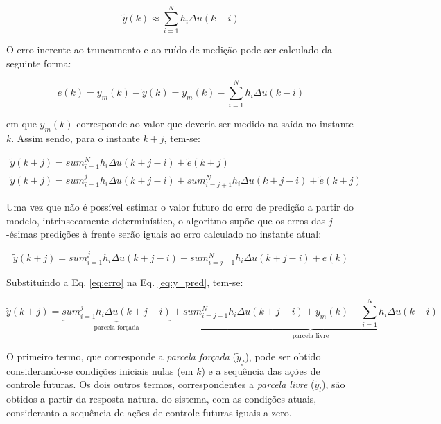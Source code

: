 \begin{equation}\label{eq:y_til}
\tilde{y}(k) \approx \sum_{i=1}^N h_i\Delta u(k-i)
\end{equation}

O erro inerente ao truncamento e ao ruído de medição pode ser calculado da
seguinte forma:

\begin{equation}\label{eq:erro}
e(k) = y_m(k) - \tilde{y}(k) = y_m(k) - \sum_{i=1}^N h_i\Delta u(k-i)
\end{equation}

\noindent em que $y_m(k)$ corresponde ao valor que deveria ser medido na saída
no instante $k$. Assim sendo, para o instante $k+j$, tem-se:

\begin{eqnarray}
\tilde{y}(k+j) = sum_{i=1}^N h_i\Delta u(k+j-i) + \tilde{e}(k+j)\nonumber\\
\tilde{y}(k+j) = sum_{i=1}^j h_i\Delta u(k+j-i) +
                 sum_{i=j+1}^N h_i\Delta u(k+j-i) + \tilde{e}(k+j)\nonumber
\end{eqnarray}

Uma vez que não é possível estimar o valor futuro do erro de predição a partir
do modelo, intrinsecamente determinístico, o algoritmo supõe que os erros das
$j$-ésimas predições à frente serão iguais ao erro calculado no instante atual:

\begin{equation}\label{eq:y_pred}
\tilde{y}(k+j) = sum_{i=1}^j h_i\Delta u(k+j-i) +
                 sum_{i=j+1}^N h_i\Delta u(k+j-i) + e(k)
\end{equation}

Substituindo a Eq. \ref{eq:erro} na Eq. \ref{eq:y_pred}, tem-se:

\begin{equation}\label{eq:dmc}
\tilde{y}(k+j) = \underbrace{sum_{i=1}^j h_i\Delta u(k+j-i)}_
                 {\text{parcela forçada}} +
                 \underbrace{sum_{i=j+1}^N h_i\Delta u(k+j-i) +
                             y_m(k) - \sum_{i=1}^N h_i\Delta u(k-i)}_
                 {\text{parcela livre}}
\end{equation}

O primeiro termo, que corresponde a {\it parcela forçada} ($\tilde{y}_f$), pode
ser obtido considerando-se condições iniciais nulas (em $k$) e a sequência das
ações de controle futuras. Os dois outros termos, correspondentes a {\it parcela
livre} ($\tilde{y}_l$), são obtidos a partir da resposta natural do sistema, com
as condições atuais, consideranto a sequência de ações de controle futuras
iguais a zero.

